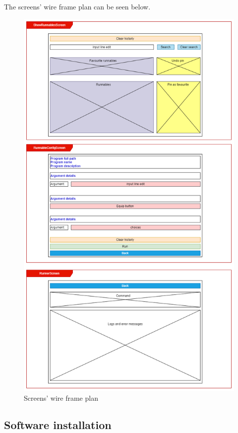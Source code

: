\documentclass{article}
\begin{document}
The screens' wire frame plan can be seen below.

\begin{figure}[h]
    \centering
    \includegraphics[width=1\linewidth]{img/wire_frame_plan.drawio.png}
    \caption{Screens' wire frame plan}
    \label{fig:enter-label}
\end{figure}

\newpage

\subsection{Software installation}
\end{document}
